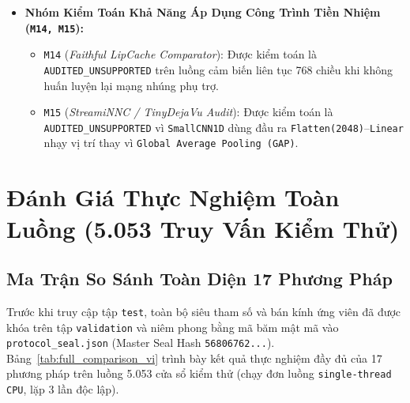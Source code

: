 \documentclass[11pt,a4paper]{article}
\newcommand{\code}[1]{{\small\ttfamily\nolinkurl{#1}}}
\theoremstyle{remark}
\begin{document}
\begin{itemize}
\begin{itemize}
      \item \code{M09} (\textit{Native Correlated Bounds}): Truyền trực tiếp các nhân tử phụ thuộc \code{affine} qua các tầng tuyến tính.
      \item \code{M10} (\textit{CROWN Ambient Box}): Nới lỏng tuyến tính ngược (\code{auto\_LiRPA CROWN}) trên hộp 768 chiều.
      \item \code{M11} (\textit{CROWN Wave/Correlated}): Nới lỏng tuyến tính \code{CROWN} trên miền sóng và tương quan.
      \item \code{M12} (\textit{Fixed-Anchor Policy Control}): Khóa cứng tâm \code{anchor} không dịch chuyển (\code{H16}).
      \item \code{M13} (\textit{Finite-Horizon Control}): Giới hạn chân trời đa bước ($H \in \{1, 2\}$) kèm cơ chế hết hạn (\code{H17}).
    \end{itemize}
  \item \textbf{Nhóm Kiểm Toán Khả Năng Áp Dụng Công Trình Tiền Nhiệm (\code{M14, M15}):}
    \begin{itemize}
      \item \code{M14} (\textit{Faithful LipCache Comparator}): Được kiểm toán là \code{AUDITED\_UNSUPPORTED} trên luồng cảm biến liên tục 768 chiều khi không huấn luyện lại mạng nhúng phụ trợ.
      \item \code{M15} (\textit{StreamiNNC / TinyDejaVu Audit}): Được kiểm toán là \code{AUDITED\_UNSUPPORTED} vì \code{SmallCNN1D} dùng đầu ra \code{Flatten(2048)}--\code{Linear} nhạy vị trí thay vì \code{Global Average Pooling (GAP)}.
    \end{itemize}
\end{itemize}

\section{Đánh Giá Thực Nghiệm Toàn Luồng (5.053 Truy Vấn Kiểm Thử)}

\subsection{Ma Trận So Sánh Toàn Diện 17 Phương Pháp}
Trước khi truy cập tập \code{test}, toàn bộ siêu tham số và bán kính ứng viên đã được khóa trên tập \code{validation} và niêm phong bằng mã băm mật mã vào \code{protocol\_seal.json} (Master Seal Hash \code{56806762...}). Bảng~\ref{tab:full_comparison_vi} trình bày kết quả thực nghiệm đầy đủ của 17 phương pháp trên luồng 5.053 cửa sổ kiểm thử (chạy đơn luồng \code{single-thread CPU}, lặp 3 lần độc lập).
\end{document}
